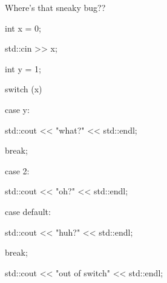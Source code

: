 Where's that sneaky bug??

\begin{console}

int x = 0;

std::cin >> x;

int y = 1;

switch (x)

{

        case y:

             std::cout << "what?" << std::endl;

             break;



        case 2:

             std::cout << "oh?" << std::endl;



        case default:

             std::cout << "huh?" << std::endl;

             break;

}

std::cout << "out of switch" << std::endl;

\end{console}

